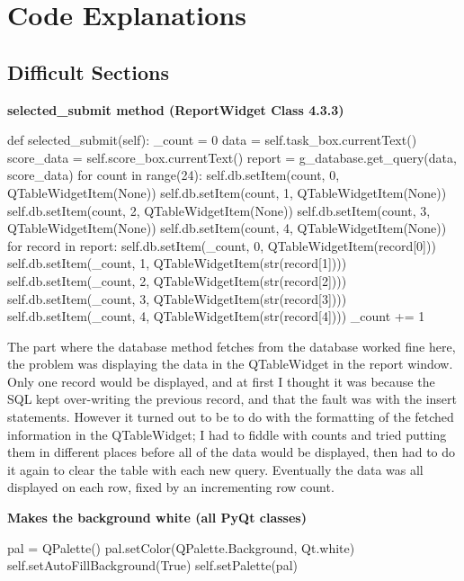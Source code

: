 \section{Code Explanations}

\subsection{Difficult Sections}

\textbf{selected\_submit method (ReportWidget Class 4.3.3)}

\begin{python}
def selected_submit(self):
        _count = 0
        data = self.task_box.currentText()
        score_data = self.score_box.currentText()
        report = g_database.get_query(data, score_data)
        for count in range(24):
            self.db.setItem(count, 0, QTableWidgetItem(None))
            self.db.setItem(count, 1, QTableWidgetItem(None))
            self.db.setItem(count, 2, QTableWidgetItem(None))
            self.db.setItem(count, 3, QTableWidgetItem(None))
            self.db.setItem(count, 4, QTableWidgetItem(None))
        for record in report:
            self.db.setItem(_count, 0, QTableWidgetItem(record[0]))
            self.db.setItem(_count, 1, QTableWidgetItem(str(record[1])))
            self.db.setItem(_count, 2, QTableWidgetItem(str(record[2])))
            self.db.setItem(_count, 3, QTableWidgetItem(str(record[3])))
            self.db.setItem(_count, 4, QTableWidgetItem(str(record[4])))
            _count += 1
\end{python}

The part where the database method fetches from the database worked fine here, the problem was displaying the data in the QTableWidget in the report window. Only one record would be displayed, and at first I thought it was because the SQL kept over-writing the previous record, and that the fault was with the insert statements. However it turned out to be to do with the formatting of the fetched information in the QTableWidget; I had to fiddle with counts and tried putting them in different places before all of the data would be displayed, then had to do it again to clear the table with each new query. Eventually the data was all displayed on each row, fixed by an incrementing row count. 

\textbf{Makes the background white (all PyQt classes)}

\begin{python}
pal = QPalette()
        pal.setColor(QPalette.Background, Qt.white)
        self.setAutoFillBackground(True)
        self.setPalette(pal)
\end{python}

